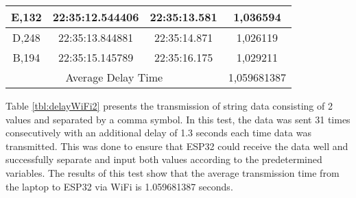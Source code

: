 \begin{table}[!h]
\begin{tabular}{|ccc|c|}
  \multicolumn{1}{|c|}{E,132} & \multicolumn{1}{c|}{22:35:12.544406} & 22:35:13.581       & 1,036594    \\ \hline
  \multicolumn{1}{|c|}{D,248} & \multicolumn{1}{c|}{22:35:13.844881} & 22:35:14.871       & 1,026119    \\ \hline
  \multicolumn{1}{|c|}{B,194} & \multicolumn{1}{c|}{22:35:15.145789} & 22:35:16.175       & 1,029211    \\ \hline
  \multicolumn{3}{|c|}{Average Delay Time}                                                & 1,059681387 \\ \hline
  \end{tabular}
\end{table}

Table \ref{tbl:delayWiFi2} presents the transmission of string data consisting of 2 values and separated by a comma symbol. In this test, the data was sent 31 times consecutively with an additional delay of 1.3 seconds each time data was transmitted. This was done to ensure that ESP32 could receive the data well and successfully separate and input both values according to the predetermined variables. The results of this test show that the average transmission time from the laptop to ESP32 via WiFi is 1.059681387 seconds.

